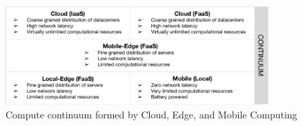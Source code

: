 \begin{figure}[tbp]
	\includegraphics[width=0.9\textwidth]{figs/Continuum.pdf}
	\caption{Compute continuum formed by Cloud, Edge, and Mobile Computing}
	\label{fig:continuum}
\end{figure}

 




